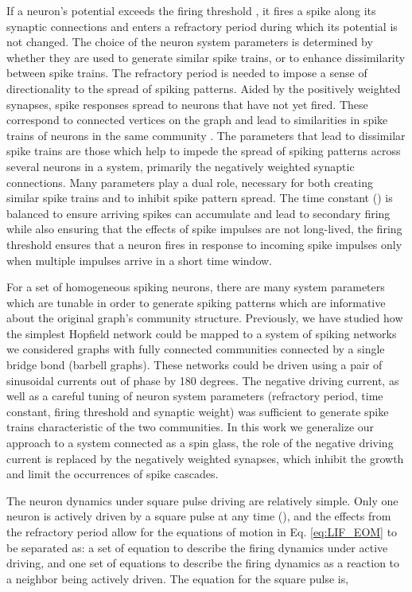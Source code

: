 \documentclass[sigconf]{acmart}
\begin{document}
If a neuron's potential exceeds the firing threshold , it fires a spike along its synaptic connections and enters a refractory period  during which its potential is not changed. The choice of the neuron system parameters is determined by whether they are used to generate similar spike trains, or to enhance dissimilarity between spike trains. The refractory period  is needed to impose a sense of directionality to the spread of spiking patterns. Aided by the positively weighted synapses, spike responses spread to neurons that have not yet fired.  These correspond to connected vertices on the graph and lead to similarities in spike trains of neurons  in the same community . The parameters that lead to dissimilar spike trains are those which help to impede the spread of spiking patterns across several neurons in a system, primarily the negatively weighted synaptic connections. Many parameters play a dual role, necessary for both creating similar spike trains and to inhibit spike pattern spread. The time constant () is balanced to ensure arriving spikes can accumulate and lead to secondary firing while also ensuring that the effects of spike impulses are not long-lived, the firing threshold  ensures that a neuron fires in response to incoming spike impulses only when multiple impulses arrive in a short time window. 

For a set of homogeneous spiking neurons, there are many system parameters which are tunable in order to generate spiking patterns which are informative about the original graph's community structure. Previously, we have studied how the simplest Hopfield network could be mapped to a system of spiking networks \cite{Hamilton2017ns17} we considered graphs with fully connected communities connected by a single bridge bond (barbell graphs). These networks could be driven using a pair of sinusoidal currents out of phase by 180 degrees. The negative driving current, as well as a careful tuning of neuron system parameters (refractory period, time constant, firing threshold and synaptic weight) was sufficient to generate spike trains characteristic of the two communities. In this work we generalize our approach to a system connected as a spin glass, the role of the negative driving current is replaced by the negatively weighted synapses, which inhibit the growth and limit the occurrences of spike cascades.

The neuron dynamics under square pulse driving are relatively simple. Only one neuron is actively driven by a square pulse at any time (), and the effects from the refractory period  allow for the equations of motion in Eq. \eqref{eq:LIF_EOM} to be separated as: a set of equation to describe the firing dynamics under active driving, and one set of equations to describe the firing dynamics as a reaction to a neighbor being actively driven. The equation for the square pulse is,
\end{document}
